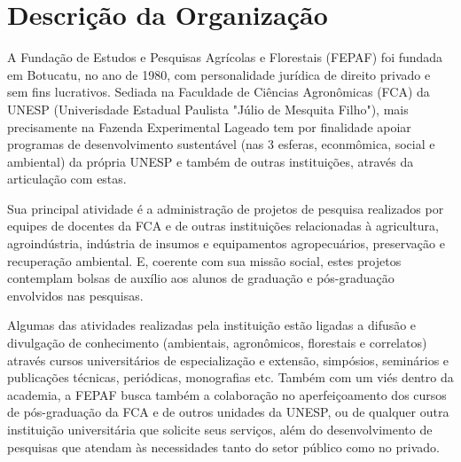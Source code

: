 \documentclass{ufscar}
\begin{document}
\section{Descrição da Organização}
A Fundação de Estudos e Pesquisas Agrícolas e Florestais (FEPAF) foi fundada em Botucatu, no ano de 1980, com personalidade jurídica de direito privado e sem fins lucrativos. Sediada na Faculdade de Ciências Agronômicas (FCA) da UNESP (Univerisdade Estadual Paulista "Júlio de Mesquita Filho"), mais precisamente na Fazenda Experimental Lageado tem por finalidade apoiar programas de desenvolvimento sustentável (nas 3 esferas, econmômica, social e ambiental) da própria UNESP e também de outras instituições, através da articulação com estas.

Sua principal atividade é a administração de projetos de pesquisa realizados por equipes de docentes da FCA e de outras instituições relacionadas à agricultura, agroindústria, indústria de insumos e equipamentos agropecuários, preservação e recuperação ambiental. E, coerente com sua missão social, estes projetos contemplam bolsas de auxílio aos alunos de graduação e pós-graduação envolvidos nas pesquisas.

Algumas das atividades realizadas pela instituição estão ligadas a difusão e divulgação de conhecimento (ambientais, agronômicos, florestais e correlatos) através cursos universitários de especialização e extensão, simpósios, seminários e publicações técnicas, periódicas, monografias etc. Também com um viés dentro da academia, a FEPAF busca também a colaboração no aperfeiçoamento  dos cursos de pós-graduação da FCA e de outros unidades da UNESP, ou de qualquer outra instituição universitária que solicite seus serviços, além do desenvolvimento de pesquisas que atendam às necessidades tanto do setor público como no privado.
\end{document}
